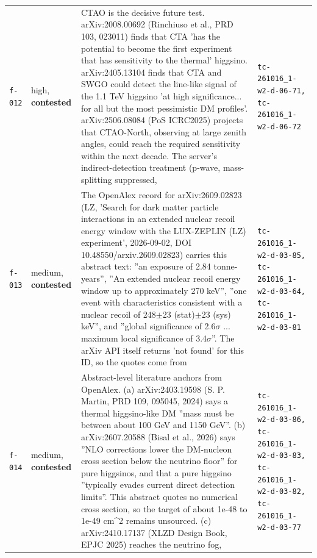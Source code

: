 \documentclass[11pt,a4paper]{article}
\begin{document}
\begin{longtable}{@{}p{}p{}p{}p{}@{}}
\texttt{f-012} & high, \textbf{contested} & CTAO is the decisive future test. arXiv:2008.00692 (Rinchiuso et al., PRD 103, 023011) finds that CTA 'has the potential to become the first experiment that has sensitivity to the thermal' higgsino. arXiv:2405.13104 finds that CTA and SWGO could detect the line-like signal of the 1.1 TeV higgsino 'at high significance... for all but the most pessimistic DM profiles'. arXiv:2506.08084 (PoS ICRC2025) projects that CTAO-North, observing at large zenith angles, could reach the required sensitivity within the next decade. The server's indirect-detection treatment (p-wave, mass-splitting suppressed, & \texttt{tc-261016\_\allowbreak{}1-w2-d-06-71,\allowbreak{} tc-261016\_\allowbreak{}1-w2-d-06-72} \\
\texttt{f-013} & medium, \textbf{contested} & The OpenAlex record for arXiv:2609.02823 (LZ, 'Search for dark matter particle interactions in an extended nuclear recoil energy window with the LUX-ZEPLIN (LZ) experiment', 2026-09-02, DOI 10.48550/arxiv.2609.02823) carries this abstract text: ''an exposure of 2.84 tonne-years'', ''An extended nuclear recoil energy window up to approximately 270 keV'', ''one event with characteristics consistent with a nuclear recoil of 248$\pm$23 (stat)$\pm$23 (sys) keV'', and ''global significance of 2.6$\sigma$ ... maximum local significance of 3.4$\sigma$''. The arXiv API itself returns 'not found' for this ID, so the quotes come from & \texttt{tc-261016\_\allowbreak{}1-w2-d-03-85,\allowbreak{} tc-261016\_\allowbreak{}1-w2-d-03-64,\allowbreak{} tc-261016\_\allowbreak{}1-w2-d-03-81} \\
\texttt{f-014} & medium, \textbf{contested} & Abstract-level literature anchors from OpenAlex. (a) arXiv:2403.19598 (S. P. Martin, PRD 109, 095045, 2024) says a thermal higgsino-like DM ''mass must be between about 100 GeV and 1150 GeV''. (b) arXiv:2607.20588 (Bisal et al., 2026) says ''NLO corrections lower the DM-nucleon cross section below the neutrino floor'' for pure higgsinos, and that a pure higgsino ''typically evades current direct detection limits''. This abstract quotes no numerical cross section, so the target of about 1e-48 to 1e-49 cm\textasciicircum{}2 remains unsourced. (c) arXiv:2410.17137 (XLZD Design Book, EPJC 2025) reaches the neutrino fog, & \texttt{tc-261016\_\allowbreak{}1-w2-d-03-86,\allowbreak{} tc-261016\_\allowbreak{}1-w2-d-03-83,\allowbreak{} tc-261016\_\allowbreak{}1-w2-d-03-82,\allowbreak{} tc-261016\_\allowbreak{}1-w2-d-03-77} \\

\end{longtable}
\end{document}
